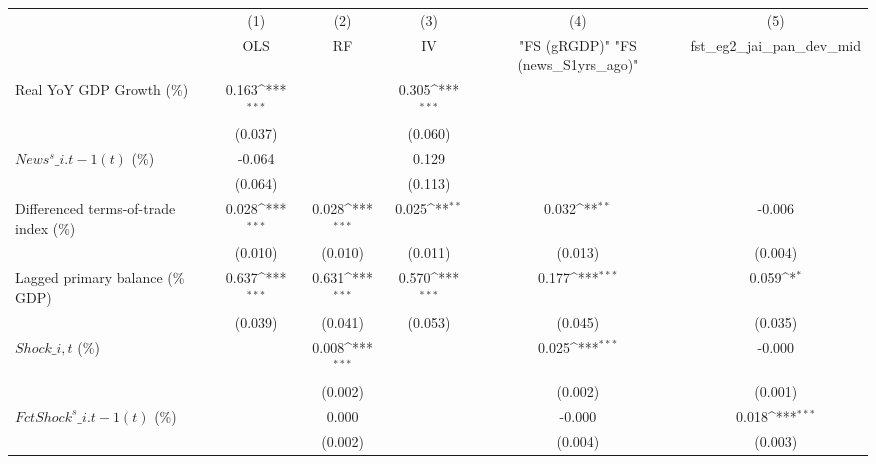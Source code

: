 {
\def\sym#1{\ifmmode^{#1}\else\(^{#1}\)\fi}
\begin{tabular}{l*{5}{c}}
\toprule
                    &\multicolumn{1}{c}{(1)}&\multicolumn{1}{c}{(2)}&\multicolumn{1}{c}{(3)}&\multicolumn{1}{c}{(4)}&\multicolumn{1}{c}{(5)}\\
                    &\multicolumn{1}{c}{OLS}&\multicolumn{1}{c}{RF}&\multicolumn{1}{c}{IV}&\multicolumn{1}{c}{ "FS (gRGDP)"  "FS (news\_S1yrs\_ago)" }&\multicolumn{1}{c}{fst\_eg2\_jai\_pan\_dev\_mid}\\
\midrule
Real YoY GDP Growth (\%)&       0.163\sym{***}&                     &       0.305\sym{***}&                     &                     \\
                    &     (0.037)         &                     &     (0.060)         &                     &                     \\
\addlinespace
$ News^s\_{i.t-1}(t)$ (\%)&      -0.064         &                     &       0.129         &                     &                     \\
                    &     (0.064)         &                     &     (0.113)         &                     &                     \\
\addlinespace
Differenced terms-of-trade index (\%)&       0.028\sym{***}&       0.028\sym{***}&       0.025\sym{**} &       0.032\sym{**} &      -0.006         \\
                    &     (0.010)         &     (0.010)         &     (0.011)         &     (0.013)         &     (0.004)         \\
\addlinespace
Lagged primary balance (\% GDP)&       0.637\sym{***}&       0.631\sym{***}&       0.570\sym{***}&       0.177\sym{***}&       0.059\sym{*}  \\
                    &     (0.039)         &     (0.041)         &     (0.053)         &     (0.045)         &     (0.035)         \\
\addlinespace
$ Shock\_{i,t}$ (\%) &                     &       0.008\sym{***}&                     &       0.025\sym{***}&      -0.000         \\
                    &                     &     (0.002)         &                     &     (0.002)         &     (0.001)         \\
\addlinespace
$ FctShock^s\_{i.t-1}(t)$ (\%)&                     &       0.000         &                     &      -0.000         &       0.018\sym{***}\\
                    &                     &     (0.002)         &                     &     (0.004)         &     (0.003)         \\

\end{tabular}}
